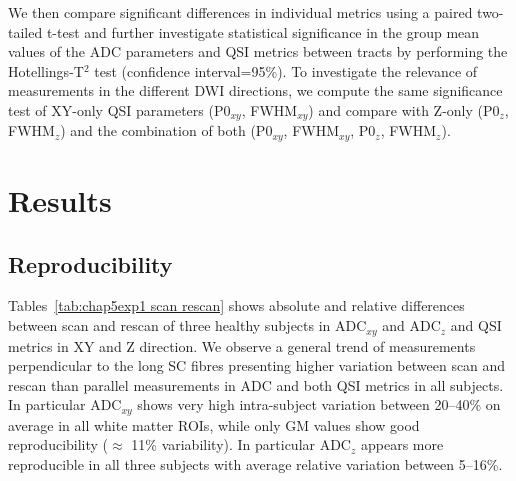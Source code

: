 We then compare significant differences in individual metrics using a paired two-tailed t-test and further investigate statistical significance in the group mean values of the \gls{ADC} parameters and \gls{QSI} metrics between tracts by performing the Hotellings-T$^2$ test (confidence interval=95\%). To investigate the relevance of measurements in the different \gls{DWI} directions, we compute the same significance test of XY-only \gls{QSI} parameters (P0$_{xy}$, FWHM$_{xy}$) and compare with Z-only (P0$_z$, FWHM$_z$) and the combination of both (P0$_{xy}$, FWHM$_{xy}$, P0$_z$, FWHM$_z$).

\section{Results}
\subsection{Reproducibility}
\label{par:chapter5 exp1 reproducibility}
Tables~\ref{tab:chap5exp1 scan rescan} shows absolute and relative differences between scan and rescan of three healthy subjects in ADC$_{xy}$ and ADC$_z$ and \gls{QSI} metrics in XY and Z direction. We observe a general trend of measurements perpendicular to the long \gls{SC} fibres presenting higher variation between scan and rescan than parallel measurements in \gls{ADC} and both \gls{QSI} metrics in all subjects. In particular ADC$_{xy}$ shows very high intra-subject variation between 20--40\% on average in all white matter \glspl{ROI}, while only GM values show good reproducibility ($\approx$ 11\% variability). In particular ADC$_z$ appears more reproducible in all three subjects with average relative variation between 5--16\%.


